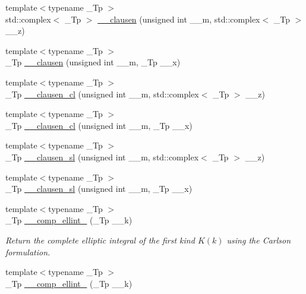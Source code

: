 \begin{DoxyCompactItemize}
{\footnotesize template$<$typename \+\_\+\+Tp $>$ }\\std\+::complex$<$ \+\_\+\+Tp $>$ \hyperlink{namespacestd_1_1____detail_a8f7e931e2a93b8d298a4df702a5e41ad}{\+\_\+\+\_\+clausen} (unsigned int \+\_\+\+\_\+m, std\+::complex$<$ \+\_\+\+Tp $>$ \+\_\+\+\_\+z)
\item 
{\footnotesize template$<$typename \+\_\+\+Tp $>$ }\\\+\_\+\+Tp \hyperlink{namespacestd_1_1____detail_a07d0f6b515fec03e423e5cecbb7580cd}{\+\_\+\+\_\+clausen} (unsigned int \+\_\+\+\_\+m, \+\_\+\+Tp \+\_\+\+\_\+x)
\item 
{\footnotesize template$<$typename \+\_\+\+Tp $>$ }\\\+\_\+\+Tp \hyperlink{namespacestd_1_1____detail_ab09b3cb1a96ba96e7fddadd0ea717b1c}{\+\_\+\+\_\+clausen\+\_\+cl} (unsigned int \+\_\+\+\_\+m, std\+::complex$<$ \+\_\+\+Tp $>$ \+\_\+\+\_\+z)
\item 
{\footnotesize template$<$typename \+\_\+\+Tp $>$ }\\\+\_\+\+Tp \hyperlink{namespacestd_1_1____detail_a523b5171a620d8816339c71994e67bb1}{\+\_\+\+\_\+clausen\+\_\+cl} (unsigned int \+\_\+\+\_\+m, \+\_\+\+Tp \+\_\+\+\_\+x)
\item 
{\footnotesize template$<$typename \+\_\+\+Tp $>$ }\\\+\_\+\+Tp \hyperlink{namespacestd_1_1____detail_ab7d250f236ef63ed8bd260881b73524d}{\+\_\+\+\_\+clausen\+\_\+sl} (unsigned int \+\_\+\+\_\+m, std\+::complex$<$ \+\_\+\+Tp $>$ \+\_\+\+\_\+z)
\item 
{\footnotesize template$<$typename \+\_\+\+Tp $>$ }\\\+\_\+\+Tp \hyperlink{namespacestd_1_1____detail_a554bb352d6397ea5991400eb3734165f}{\+\_\+\+\_\+clausen\+\_\+sl} (unsigned int \+\_\+\+\_\+m, \+\_\+\+Tp \+\_\+\+\_\+x)
\item 
{\footnotesize template$<$typename \+\_\+\+Tp $>$ }\\\+\_\+\+Tp \hyperlink{namespacestd_1_1____detail_a7b23bcf7e9f20b1e353a047126e13af1}{\+\_\+\+\_\+comp\+\_\+ellint\+\_} (\+\_\+\+Tp \+\_\+\+\_\+k)
\begin{DoxyCompactList}\small\item\em Return the complete elliptic integral of the first kind $ K(k) $ using the Carlson formulation. \end{DoxyCompactList}\item 
{\footnotesize template$<$typename \+\_\+\+Tp $>$ }\\\+\_\+\+Tp \hyperlink{namespacestd_1_1____detail_a4836f4db24abd037705100750f82d375}{\+\_\+\+\_\+comp\+\_\+ellint\+\_} (\+\_\+\+Tp \+\_\+\+\_\+k)

\end{DoxyCompactItemize}
